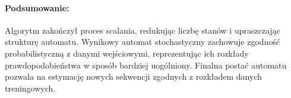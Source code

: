 \paragraph*{Podsumowanie:}  
Algorytm zakończył proces scalania, redukując liczbę stanów i upraszczając strukturę automatu. Wynikowy automat stochastyczny zachowuje zgodność probabilistyczną z danymi wejściowymi, reprezentując ich rozkłady prawdopodobieństwa w sposób bardziej uogólniony. Finalna postać automatu pozwala na estymację nowych sekwencji zgodnych z rozkładem danych treningowych.  
